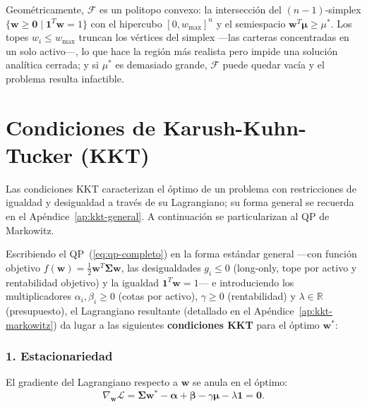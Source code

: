 Geométricamente, $\mathcal{F}$ es un politopo convexo: la intersección del
$(n-1)$-simplex $\{\mathbf{w} \ge \mathbf{0} \mid \mathbf{1}^T \mathbf{w} = 1\}$
con el hipercubo $[0, w_{\max}]^n$ y el semiespacio $\mathbf{w}^T
\boldsymbol{\mu} \ge \mu^*$. Los topes $w_i \le w_{\max}$ truncan los vértices
del simplex ---las carteras concentradas en un solo activo---, lo que hace la
región más realista pero impide una solución analítica cerrada; y si $\mu^*$ es
demasiado grande, $\mathcal{F}$ puede quedar vacía y el problema resulta
infactible.

\section{Condiciones de Karush-Kuhn-Tucker (KKT)}

Las condiciones KKT caracterizan el óptimo de un problema con restricciones de
igualdad y desigualdad a través de su Lagrangiano; su forma general se recuerda
en el Apéndice~\ref{ap:kkt-general}. A continuación se particularizan al QP de
Markowitz.

Escribiendo el QP~(\ref{eq:qp-completo}) en la forma estándar general ---con
función objetivo $f(\mathbf{w}) = \frac{1}{2}\mathbf{w}^T \boldsymbol{\Sigma}
\mathbf{w}$, las desigualdades $g_i \le 0$ (long-only, tope por activo y
rentabilidad objetivo) y la igualdad $\mathbf{1}^T\mathbf{w} = 1$--- e
introduciendo los multiplicadores $\alpha_i, \beta_i \ge 0$ (cotas por activo),
$\gamma \ge 0$ (rentabilidad) y $\lambda \in \mathbb{R}$ (presupuesto), el
Lagrangiano resultante (detallado en el Apéndice~\ref{ap:kkt-markowitz}) da lugar
a las siguientes \textbf{condiciones KKT} para el óptimo $\mathbf{w}^*$:

\subsubsection*{1. Estacionariedad}

El gradiente del Lagrangiano respecto a $\mathbf{w}$ se anula en el óptimo:
\begin{equation}
    \nabla_{\mathbf{w}} \mathcal{L}
    = \boldsymbol{\Sigma} \mathbf{w}^*
    - \boldsymbol{\alpha} + \boldsymbol{\beta}
    - \gamma \boldsymbol{\mu}
    - \lambda \mathbf{1}
    = \mathbf{0}.
    \label{eq:kkt-estacionariedad}
\end{equation}

